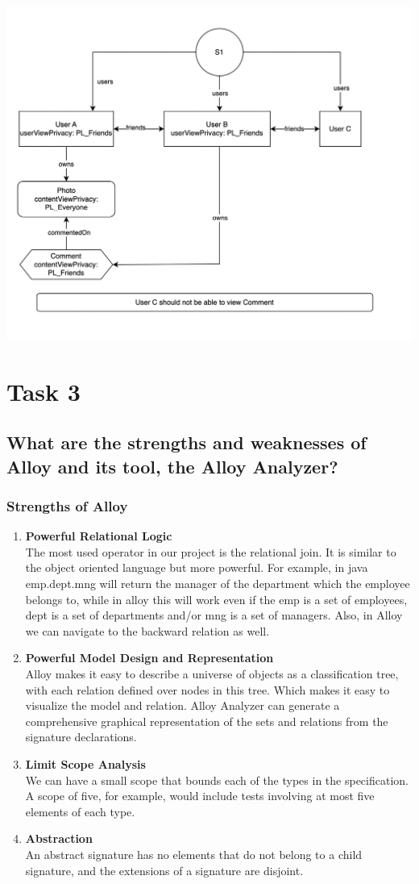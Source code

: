 \documentclass[titlepage]{article}
\begin{document}
\includegraphics[width=6in]{images/privacy_violation.png}


\section{Task 3}
\subsection{What are the strengths and weaknesses of Alloy and its tool, the Alloy Analyzer?}
\subsubsection{Strengths of Alloy}
\begin{enumerate}
	\item \textbf{Powerful Relational Logic} \\
	The most used operator in our project is the relational join. It is similar to the object oriented language but more powerful. For example, in java emp.dept.mng will return the manager of the department which the employee belongs to, while in alloy this will work even if the emp is a set of employees, dept is a set of departments and/or mng is a set of managers. Also, in Alloy we can navigate to the backward relation as well.
	\item \textbf{Powerful Model Design and Representation} \\
	Alloy makes it easy to describe a universe of objects as a classification tree, with each relation defined over nodes in this tree. Which makes it easy to visualize the model and relation. Alloy Analyzer can generate a comprehensive graphical representation of the sets and relations from the signature declarations.
	\item \textbf{Limit Scope Analysis} \\
	We can have a small scope that bounds each of the types in the specification. A scope of five, for example, would include tests involving at most five elements of each type.
	\item \textbf{Abstraction} \\
	An abstract signature has no elements that do not belong to a child signature, and the extensions of a signature are disjoint. 
\end{enumerate}
\end{document}
